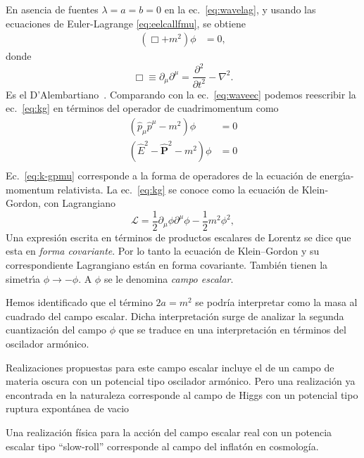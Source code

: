 En asencia de fuentes $\lambda=a=b=0$ en la ec.~\eqref{eq:wavelag}, y usando las
ecuaciones de Euler-Lagrange \eqref{eq:eelcallfmu}, se obtiene
\begin{align}
  \label{eq:kg} 
  (\Box+m^2)\phi&=0,
\end{align}
donde
\begin{equation}
  \label{eq:dalambertiano}
  \Box\equiv\partial_\mu\partial^\mu=\frac{\partial^2}{\partial t^2}-\nabla^2. 
\end{equation}
Es el D'Alembartiano~\cite{daelembertiano}.
Comparando con la ec.~\eqref{eq:waveec} podemos reescribir la ec.~\eqref{eq:kg} en términos del operador de cuadrimomentum como
\begin{align}
  (\hat{p}_\mu\hat{p}^\mu-m^2)\phi&=0\nonumber\\
  \label{eq:k-gpmu} %
(\hat{E}^2-\hat{\mathbf{P}}^2-m^2)\phi&=0\\
\end{align}
Ec.~\eqref{eq:k-gpmu} %
corresponde a la forma de operadores de la
ecuaci\'on de energ\'\i a-momentum relativista. La
ec.~\eqref{eq:kg} se conoce como la ecuaci\'on de Klein-Gordon, con
Lagrangiano
\begin{equation}
  \label{eq:kglag}
  \mathcal{L}=\frac{1}{2}\partial_\mu\phi\partial^\mu\phi-\frac{1}{2}m^2\phi^2, 
\end{equation}
Una expresi\'on escrita en t\'erminos de productos escalares de
Lorentz se dice que esta en \emph{forma covariante}. Por lo tanto la
ecuaci\'on de Klein--Gordon y su correspondiente Lagrangiano est\'an
en forma covariante. Tambi\'en tienen la simetr\'\i a
$\phi\to-\phi$. A $\phi$ se le denomina \emph{campo escalar}.

Hemos identificado que el término $2a=m^2$ se podría interpretar como la masa al cuadrado del campo escalar. Dicha interpretación surge de analizar la segunda cuantización del campo $\phi$ que se traduce en una interpretación en términos del oscilador armónico.

Realizaciones propuestas para este campo escalar incluye el de un campo de materia oscura con un potencial tipo oscilador armónico.
Pero una realización ya encontrada en la naturaleza corresponde al campo de Higgs con un potencial tipo ruptura expontánea de vacio

Una realización física para la acción del campo escalar real con un potencia escalar tipo ``slow-roll''  corresponde al campo del inflatón en cosmología.



